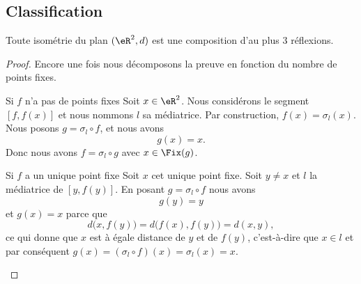 \subsection{Classification}

\begin{theorem}      \label{THOooRORQooTDWFdv}
    Toute isométrie du plan \( (\eR^2,d)\) est une composition d'au plus \( 3\) réflexions.
\end{theorem}

\begin{proof}
    Encore une fois nous décomposons la preuve en fonction du nombre de points fixes.
    \begin{subproof}
        \item[Si \( f\) n'a pas de points fixes]
            Soit \( x\in \eR^2\). Nous considérons le segment \( [f,f(x)]\) et nous nommons \( l\) sa médiatrice. Par construction, \( f(x)=\sigma_l(x)\). Nous posons \( g=\sigma_l\circ f\), et nous avons
            \begin{equation}
                g(x)=x.
            \end{equation}
            Donc nous avons \( f=\sigma_l\circ g\) avec \( x\in\Fix(g)\).
        \item[Si \( f\) a un unique point fixe]
            Soit \( x\) cet unique point fixe. Soit \( y\neq x\) et \( l\) la médiatrice de \( [y,f(y)]\). En posant \( g=\sigma_l\circ f\) nous avons
            \begin{equation}
                g(y)=y
            \end{equation}
            et \( g(x)=x\) parce que
            \begin{equation}
                d\big( x,f(y) \big)=d\big( f(x),f(y) \big)=d(x,y),
            \end{equation}
            ce qui donne que \( x\) est à égale distance de \( y\) et de \( f(y)\), c'est-à-dire que \( x\in l\) et par conséquent \( g(x)=(\sigma_l\circ f)(x)=\sigma_l(x)=x\).


\end{subproof}
\end{proof}
